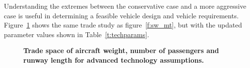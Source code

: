 \documentclass[]{aiaa-tc}%
\begin{document}
Understanding the extremes between the conservative case and a more aggressive case is useful in determining a feasible vehicle design and vehicle requirements. 
Figure~\ref{f:sw_mtt} shows the same trade study as figure~\ref{f:sw_mt}, but with the updated parameter values shown in Table~\ref{t:techparams}.

\begin{figure}[h!]
 \begin{subfigmatrix}{2}%
 \end{subfigmatrix}
    \caption{\textbf{Trade space of aircraft weight, number of passengers and runway length for advanced technology assumptions.}}
 \label{f:sw_mtt}
\end{figure}
\end{document}
